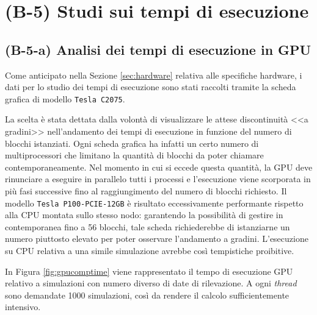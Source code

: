 \section{(B-5) Studi sui tempi di esecuzione} \label{sec:comptime}
\subsection{(B-5-a) Analisi dei tempi di esecuzione in GPU}
Come anticipato nella Sezione \ref{sec:hardware} relativa alle specifiche hardware, i dati per lo studio dei tempi di esecuzione sono stati raccolti tramite la scheda grafica di modello \verb|Tesla C2075|.

La scelta è stata dettata dalla volontà di visualizzare le attese discontinuità <<a gradini>> nell'andamento dei tempi di esecuzione in funzione del numero di blocchi istanziati. Ogni scheda grafica ha infatti un certo numero di multiprocessori che limitano la quantità di blocchi da poter chiamare contemporaneamente. Nel momento in cui si eccede questa quantità, la GPU deve rinunciare a eseguire in parallelo tutti i processi e l'esecuzione viene scorporata in più fasi successive fino al raggiungimento del numero di blocchi richiesto.
Il modello \verb|Tesla P100-PCIE-12GB| è risultato eccessivamente performante rispetto alla CPU montata sullo stesso nodo: garantendo la possibilità di gestire in contemporanea fino a 56 blocchi, tale scheda richiederebbe di istanziarne un numero piuttosto elevato per poter osservare l'andamento a gradini. L'esecuzione su CPU relativa a una simile simulazione avrebbe così tempistiche proibitive.

In Figura \ref{fig:gpucomptime} viene rappresentato il tempo di esecuzione GPU relativo a simulazioni con numero diverso di date di rilevazione. A ogni \textit{thread} sono demandate 1000 simulazioni, così da rendere il calcolo sufficientemente intensivo.


